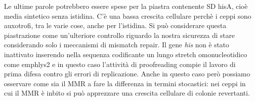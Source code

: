 Le ultime parole potrebbero essere spese per la piastra contenente SD hisA, cioè media sintetico senza istidina. 
C'è una bassa crescita cellulare perchè i ceppi sono auxotrofi, tra le varie cose, anche per l'istidina. 
Si può considerare questa piastrazione come un'ulteriore controllo riguardo la nostra sicurezza di stare considerando solo i meccanismi di mismatch repair. 
Il gene \emph{his} non è stato inattivato inserendo nella sequenza codificante un lungo stretch omonucleotidico come emph{lys2} e in questo caso l'attività di proofreading compie il lavoro di prima difesa contro gli errori di replicazione. 
Anche in questo caso però possiamo osservare come sia il MMR a fare la differenza in termini stocastici: nei ceppi in cui il MMR è inbito si può apprezzare una crescita cellulare di colonie revertanti. 
